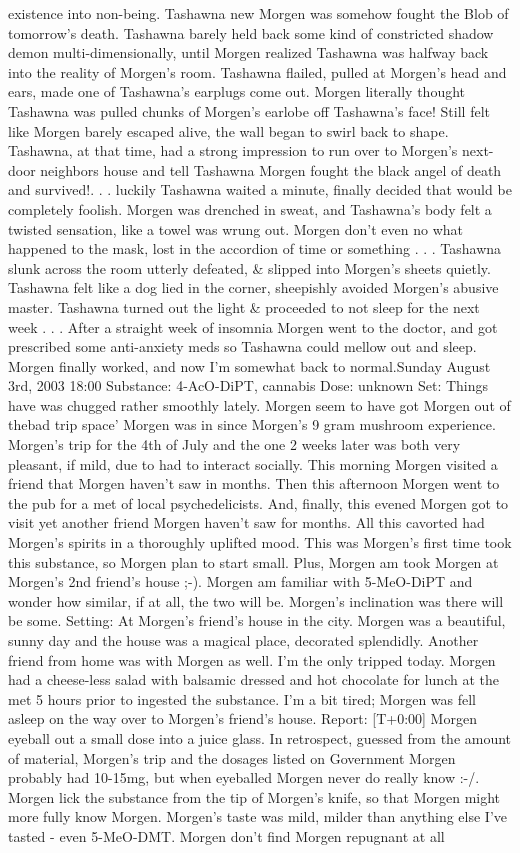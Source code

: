 \documentclass[12pt]{book}
\begin{document}
existence into non-being. Tashawna new Morgen was somehow fought the Blob of tomorrow's death. Tashawna barely held back some kind of constricted shadow demon multi-dimensionally, until Morgen realized Tashawna was halfway back into the reality of Morgen's room. Tashawna flailed, pulled at Morgen's head and ears, made one of Tashawna's earplugs come out. Morgen literally thought Tashawna was pulled chunks of Morgen's earlobe off Tashawna's face! Still felt like Morgen barely escaped alive, the wall began to swirl back to shape. Tashawna, at that time, had a strong impression to run over to Morgen's next-door neighbors house and tell Tashawna Morgen fought the black angel of death and survived!. . . luckily Tashawna waited a minute, finally decided that would be completely foolish. Morgen was drenched in sweat, and Tashawna's body felt a twisted sensation, like a towel was wrung out. Morgen don't even no what happened to the mask, lost in the accordion of time or something . . .  Tashawna slunk across the room utterly defeated, \& slipped into Morgen's sheets quietly. Tashawna felt like a dog lied in the corner, sheepishly avoided Morgen's abusive master. Tashawna turned out the light \& proceeded to not sleep for the next week . . .  After a straight week of insomnia Morgen went to the doctor, and got prescribed some anti-anxiety meds so Tashawna could mellow out and sleep. Morgen finally worked, and now I'm somewhat back to normal.Sunday August 3rd, 2003 18:00 Substance: 4-AcO-DiPT, cannabis Dose: unknown Set: Things have was chugged rather smoothly lately. Morgen seem to have got Morgen out of thebad trip space' Morgen was in since Morgen's 9 gram mushroom experience. Morgen's trip for the 4th of July and the one 2 weeks later was both very pleasant, if mild, due to had to interact socially. This morning Morgen visited a friend that Morgen haven't saw in months. Then this afternoon Morgen went to the pub for a met of local psychedelicists. And, finally, this evened Morgen got to visit yet another friend Morgen haven't saw for months. All this cavorted had Morgen's spirits in a thoroughly uplifted mood. This was Morgen's first time took this substance, so Morgen plan to start small. Plus, Morgen am took Morgen at Morgen's 2nd friend's house ;-). Morgen am familiar with 5-MeO-DiPT and wonder how similar, if at all, the two will be. Morgen's inclination was there will be some. Setting: At Morgen's friend's house in the city. Morgen was a beautiful, sunny day and the house was a magical place, decorated splendidly. Another friend from home was with Morgen as well. I'm the only tripped today. Morgen had a cheese-less salad with balsamic dressed and hot chocolate for lunch at the met 5 hours prior to ingested the substance. I'm a bit tired; Morgen was fell asleep on the way over to Morgen's friend's house. Report: [T+0:00] Morgen eyeball out a small dose into a juice glass. In retrospect, guessed from the amount of material, Morgen's trip and the dosages listed on Government Morgen probably had 10-15mg, but when eyeballed Morgen never do really know :-/. Morgen lick the substance from the tip of Morgen's knife, so that Morgen might more fully know Morgen. Morgen's taste was mild, milder than anything else I've tasted - even 5-MeO-DMT. Morgen don't find Morgen repugnant at all 
\end{document}
